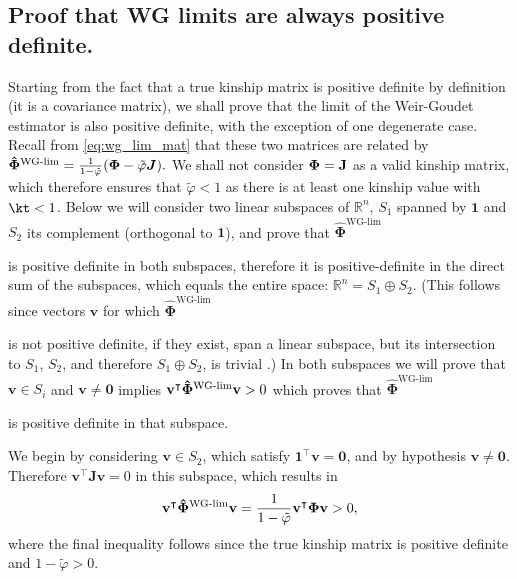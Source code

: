 \documentclass[11pt]{article}
\newcommand{\kinMat}{%
  \ensuremath{%
    \mathbf{\Phi}
  }%
  \xspace%
}%
\newcommand{\kinMatEstNamed}[1]{%
  \ensuremath{%
    \mathbf{\hat{\Phi}}^\text{#1}
  }%
  \xspace%
}%
\newcommand{\kinMatWGLim}{%
  \kinMatEstNamed{WG-lim}
}%
\begin{document}
\begin{appendices}
  \section{Proof that WG limits are always positive definite.}

  \label{sec:wg_posdef}

  Starting from the fact that a true kinship matrix is positive definite by definition (it is a covariance matrix), we shall prove that the limit of the Weir-Goudet estimator is also positive definite, with the exception of one degenerate case.
  Recall from \cref{eq:wg_lim_mat} that these two matrices are related by
  $
  \kinMatWGLim
  =
  \frac{1}{1-\tilde{\varphi}}(\kinMat-\tilde{\varphi}\boldsymbol{J})
  .
  $
  We shall not consider $\kinMat = \mathbf{J}$ as a valid kinship matrix, which therefore ensures that $\tilde{\varphi} < 1$ as there is at least one kinship value with $\kt < 1$.
  Below we will consider two linear subspaces of $\mathbb{R}^n$, $S_1$ spanned by $\mathbf{1}$ and $S_2$ its complement (orthogonal to $\mathbf{1}$), and prove that \kinMatWGLim is positive definite in both subspaces, therefore it is positive-definite in the direct sum of the subspaces, which equals the entire space: $\mathbb{R}^n = S_1 \oplus S_2$.
  (This follows since vectors $\mathbf{v}$ for which \kinMatWGLim is not positive definite, if they exist, span a linear subspace, but its intersection to $S_1$, $S_2$, and therefore $S_1 \oplus S_2$, is trivial \citep{hefferon_linear_2020}.)
  In both subspaces we will prove that $\mathbf{v} \in S_i$ and $\mathbf{v} \ne \mathbf{0}$ implies $\mathbf{v}^\intercal \kinMatWGLim \mathbf{v} > 0$ which proves that \kinMatWGLim is positive definite in that subspace.

  We begin by considering $\mathbf{v} \in S_2$, which satisfy $\mathbf{1}^\intercal \mathbf{v} = \mathbf{0}$, and by hypothesis $\mathbf{v} \ne \mathbf{0}$.
  Therefore $\mathbf{v}^\intercal \mathbf{J} \mathbf{v} = 0$ in this subspace, which results in
  $$
  \mathbf{v}^\intercal \kinMatWGLim \mathbf{v}
  =
  \frac{1}{1-\tilde{\varphi}} \mathbf{v}^\intercal \kinMat \mathbf{v}
  >
  0
  ,
  $$
  where the final inequality follows since the true kinship matrix is positive definite and $1-\tilde{\varphi} > 0$.


\end{appendices}
\end{document}
